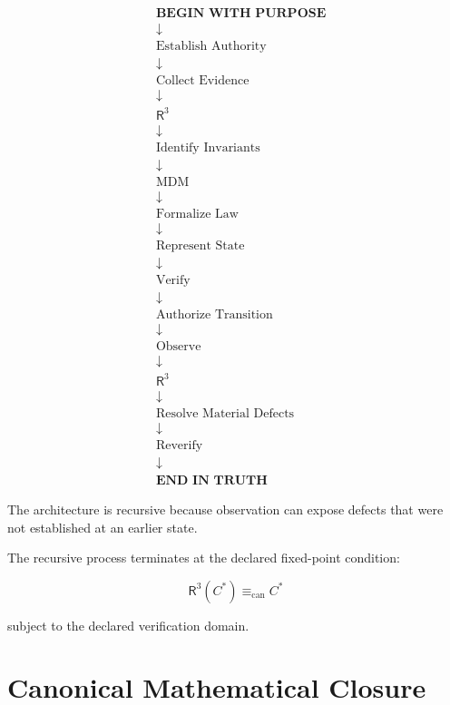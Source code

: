 \documentclass[11pt]{article}
\newcommand{\Rthree}{\ensuremath{\mathsf{R}^{3}}}
\newcommand{\MDM}{\ensuremath{\mathrm{MDM}}}
\begin{document}
\[
\boxed{
\begin{aligned}
&\textbf{BEGIN WITH PURPOSE}\\
&\downarrow\\
&\text{Establish Authority}\\
&\downarrow\\
&\text{Collect Evidence}\\
&\downarrow\\
&\Rthree{}\\
&\downarrow\\
&\text{Identify Invariants}\\
&\downarrow\\
&\MDM\\
&\downarrow\\
&\text{Formalize Law}\\
&\downarrow\\
&\text{Represent State}\\
&\downarrow\\
&\text{Verify}\\
&\downarrow\\
&\text{Authorize Transition}\\
&\downarrow\\
&\text{Observe}\\
&\downarrow\\
&\Rthree{}\\
&\downarrow\\
&\text{Resolve Material Defects}\\
&\downarrow\\
&\text{Reverify}\\
&\downarrow\\
&\boxed{\textbf{END IN TRUTH}}
\end{aligned}
}
\]

The architecture is recursive because observation can expose
defects that were not established at an earlier state.

The recursive process terminates at the declared fixed-point
condition:

\[
\boxed{
\Rthree(C^{*})
\equiv_{\mathrm{can}}
C^{*}
}
\]

subject to the declared verification domain.

\section{Canonical Mathematical Closure}
\end{document}
